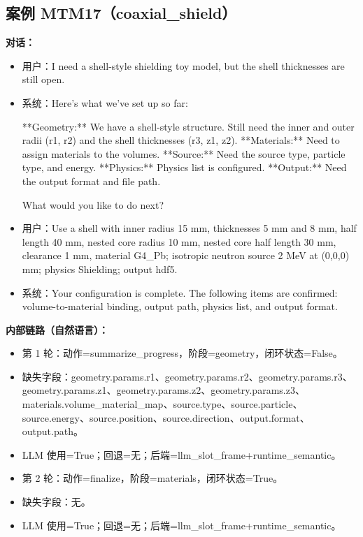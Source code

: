 \documentclass[11pt]{ctexart}
\begin{document}
\subsection{案例 MTM17（coaxial\_shield）}
\textbf{对话：}
\begin{itemize}
\item 用户：I need a shell-style shielding toy model, but the shell thicknesses are still open.
\item 系统：Here's what we've set up so far:

**Geometry:** We have a shell-style structure. Still need the inner and outer radii (r1, r2) and the shell thicknesses (r3, z1, z2).
**Materials:** Need to assign materials to the volumes.
**Source:** Need the source type, particle type, and energy.
**Physics:** Physics list is configured.
**Output:** Need the output format and file path.

What would you like to do next?
\item 用户：Use a shell with inner radius 15 mm, thicknesses 5 mm and 8 mm, half length 40 mm, nested core radius 10 mm, nested core half length 30 mm, clearance 1 mm, material G4\_Pb; isotropic neutron source 2 MeV at (0,0,0) mm; physics Shielding; output hdf5.
\item 系统：Your configuration is complete. The following items are confirmed: volume-to-material binding, output path, physics list, and output format.
\end{itemize}
\textbf{内部链路（自然语言）：}
\begin{itemize}
\item 第 1 轮：动作=summarize\_progress，阶段=geometry，闭环状态=False。
\item 缺失字段：geometry.params.r1、geometry.params.r2、geometry.params.r3、geometry.params.z1、geometry.params.z2、geometry.params.z3、materials.volume\_material\_map、source.type、source.particle、source.energy、source.position、source.direction、output.format、output.path。
\item LLM 使用=True；回退=无；后端=llm\_slot\_frame+runtime\_semantic。
\item 第 2 轮：动作=finalize，阶段=materials，闭环状态=True。
\item 缺失字段：无。
\item LLM 使用=True；回退=无；后端=llm\_slot\_frame+runtime\_semantic。
\end{itemize}
\end{document}
